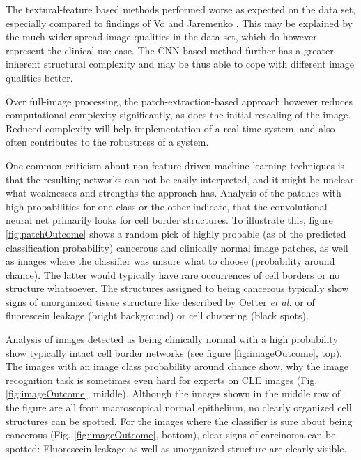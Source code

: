 \documentclass[fleqn,10pt]{wlscirep}
\begin{document}
The textural-feature based methods performed worse as expected on the data set, especially compared to findings of Vo \cite{Vo:2016} and Jaremenko \cite{Jaremenko:2015kh}. This may be explained by the much wider spread image qualities in the data set, which do however represent the clinical use case. The CNN-based method further has a greater inherent structural complexity and may be thus able to cope with different image qualities better.

Over full-image processing, the patch-extraction-based approach however reduces computational complexity significantly, as does the initial rescaling of the image. Reduced complexity will help implementation of a real-time system, and also often contributes to the robustness of a system.

One common criticism about non-feature driven machine learning techniques is that the resulting networks can not be easily interpreted, and it might be unclear what weaknesses and strengths the approach has. Analysis of the patches with high probabilities for one class or the other indicate, that the convolutional neural net primarily looks for cell border structures. To illustrate this, figure \ref{fig:patchOutcome} shows a random pick of highly probable (as of the predicted classification probability) cancerous and clinically normal image patches, as well as images where the classifier was unsure what to choose (probability around chance). The latter would typically have rare occurrences of cell borders or no structure whatsoever. The structures assigned to being cancerous typically show signs of unorganized tissue structure like described by Oetter \textit{et al.}\cite{Oetter:2016cp} or of fluorescein leakage (bright background) or cell clustering (black spots).


Analysis of images detected as being clinically normal with a high probability show typically intact cell border networks (see figure \ref{fig:imageOutcome}, top). The images with an image class probability around chance show, why the image recognition task is sometimes even hard for experts on CLE images (Fig. \ref{fig:imageOutcome}, middle). Although the images shown in the middle row of the figure are all from macroscopical normal epithelium, no clearly organized cell structures can be spotted. For the images where the classifier is sure about being cancerous (Fig. \ref{fig:imageOutcome}, bottom), clear signs of carcinoma can be spotted: Fluorescein leakage as well as unorganized structure are clearly visible.
\end{document}
